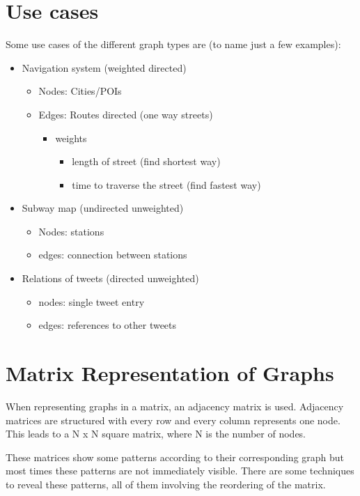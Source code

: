 \section{Use cases}
Some use cases of the different graph types are (to name just a few examples):
\begin{itemize}
\item Navigation system (weighted directed)
	\begin{itemize}
		\item Nodes: Cities/POIs
		\item Edges: Routes directed (one way streets)
		\begin{itemize}
			\item weights
			\begin{itemize}
				\item length of street (find shortest way)
				\item time to traverse the street (find fastest way)
			\end{itemize}		
		\end{itemize}
	\end{itemize}		
\item Subway map (undirected unweighted)
\begin{itemize}
	\item Nodes: stations
	\item edges: connection between stations
\end{itemize}
\item Relations of tweets (directed unweighted)
\begin{itemize}
	\item nodes: single tweet entry
	\item edges: references to other tweets
\end{itemize}
\end{itemize}


\section{Matrix Representation of Graphs}

When representing graphs in a matrix, an adjacency matrix is used. Adjacency matrices are structured with every row and every column represents one node. This leads to a N x N square matrix, where N is the number of nodes. 

These matrices show some patterns according to their corresponding graph but most times these patterns are not immediately visible. There are some techniques to reveal these patterns, all of them involving the reordering of the matrix.


